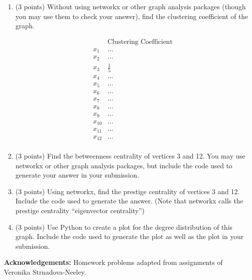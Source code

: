 \documentclass[11pt]{article}
\begin{document}
\begin{enumerate}
    \item (3 points) Without using networkx or other graph analysis packages
    (though you may use them to check your answer), find the clustering
    coefficient of the graph.

    $$
        \begin{matrix}
                    &  \text{Clustering Coefficient} \\
            x_1     &  \dots \\
            x_2     &  \dots \\
            x_3     &  \frac{1}{5} \\
            x_4     &  \dots \\
            x_5     &  \dots \\
            x_6     &  \dots \\
            x_7     &  \dots \\
            x_8     &  \dots \\
            x_9     &  \dots \\
            x_{10}  &  \dots \\
            x_{11}  &  \dots \\
            x_{12}  &  \dots \\
        \end{matrix}
    $$

    \item (3 points) Find the betweenness centrality of vertices 3 and 12. You
    may use networkx or other graph analysis packages, but include the code used
    to generate your answer in your submission.

    \item (3 points) Using networkx, find the prestige centrality of vertices 3
    and 12. Include the code used to generate the answer. (Note that networkx
    calls the prestige centrality ``eigenvector centrality'')

    \item (3 points) Use Python to create a plot for the degree distribution of
    this graph.  Include the code used to generate the plot as well as the plot
    in your submission.

\end{enumerate}

{\bf Acknowledgements:} Homework problems adapted from assignments of
Veronika Strnadova-Neeley.
\end{document}
